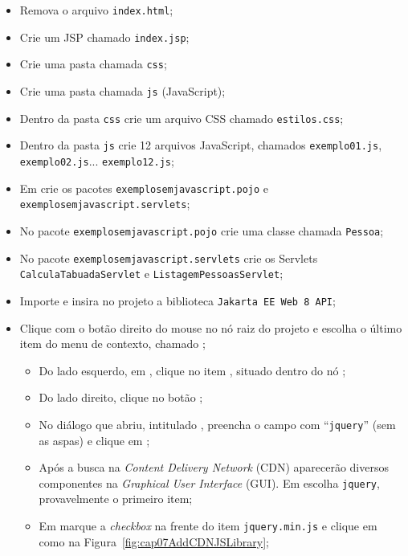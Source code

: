 \begin{itemize}
    \item Remova o arquivo \texttt{index.html};
    \item Crie um JSP chamado \texttt{index.jsp};
    \item Crie uma pasta chamada \texttt{css};
    \item Crie uma pasta chamada \texttt{js} (JavaScript);
    \item Dentro da pasta \texttt{css} crie um arquivo CSS chamado \texttt{estilos.css};
    \item Dentro da pasta \texttt{js} crie 12 arquivos JavaScript, chamados \texttt{exemplo01.js}, \texttt{exemplo02.js}... \texttt{exemplo12.js};
    \item Em  crie os pacotes \texttt{exemplosemjavascript.pojo} e\newline%
    \texttt{exemplosemjavascript.servlets};
    \item No pacote \texttt{exemplosemjavascript.pojo} crie uma classe chamada \texttt{Pessoa};
    \item No pacote \texttt{exemplosemjavascript.servlets} crie os Servlets \texttt{CalculaTabuadaServlet} e \texttt{ListagemPessoasServlet};
    \item Importe e insira no projeto a biblioteca \texttt{Jakarta EE Web 8 API};
    \item Clique com o botão direito do mouse no nó raiz do projeto e escolha o último item do menu de contexto, chamado ;
    \begin{itemize}
        \item Do lado esquerdo, em , clique no item , situado dentro do nó ;
        \item Do lado direito, clique no botão ;
        \item No diálogo que abriu, intitulado , preencha o campo  com ``\texttt{jquery}'' (sem as aspas) e clique em ;
        \item Após a busca na \textit{Content Delivery Network} (CDN) aparecerão diversos componentes na \textit{Graphical User Interface} (GUI). Em  escolha \texttt{jquery}, provavelmente o primeiro item;
        \item Em  marque a \textit{checkbox} na frente do item \texttt{jquery.min.js} e clique em  como na Figura~\ref{fig:cap07AddCDNJSLibrary};

\end{itemize}
\end{itemize}

